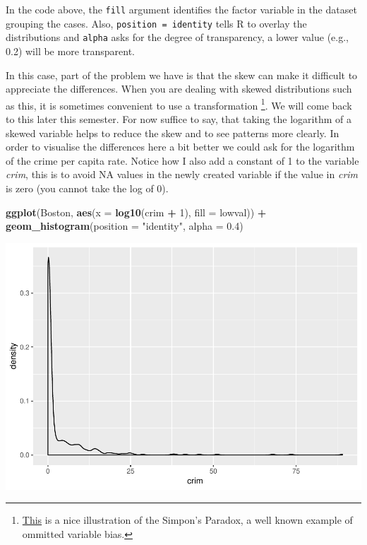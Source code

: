 \documentclass[]{book}
\newenvironment{Shaded}{\begin{snugshade}}{\end{snugshade}}
\newcommand{\DataTypeTok}[1]{\textcolor[rgb]{0.13,0.29,0.53}{#1}}
\newcommand{\DecValTok}[1]{\textcolor[rgb]{0.00,0.00,0.81}{#1}}
\newcommand{\FloatTok}[1]{\textcolor[rgb]{0.00,0.00,0.81}{#1}}
\newcommand{\KeywordTok}[1]{\textcolor[rgb]{0.13,0.29,0.53}{\textbf{#1}}}
\newcommand{\NormalTok}[1]{#1}
\newcommand{\OperatorTok}[1]{\textcolor[rgb]{0.81,0.36,0.00}{\textbf{#1}}}
\newcommand{\StringTok}[1]{\textcolor[rgb]{0.31,0.60,0.02}{#1}}
\let\rmarkdownfootnote\footnote%
\def\footnote{\protect\rmarkdownfootnote}
\theoremstyle{definition}
\theoremstyle{definition}
\theoremstyle{definition}
\theoremstyle{remark}
\begin{document}
In the code above, the \texttt{fill} argument identifies the factor
variable in the dataset grouping the cases. Also,
\texttt{position\ =\ identity} tells R to overlay the distributions and
\texttt{alpha} asks for the degree of transparency, a lower value (e.g.,
0.2) will be more transparent.

In this case, part of the problem we have is that the skew can make it
difficult to appreciate the differences. When you are dealing with
skewed distributions such as this, it is sometimes convenient to use a
transformation \footnote{\href{http://vudlab.com/simpsons/}{This} is a
  nice illustration of the Simpon's Paradox, a well known example of
  ommitted variable bias.}. We will come back to this later this
semester. For now suffice to say, that taking the logarithm of a skewed
variable helps to reduce the skew and to see patterns more clearly. In
order to visualise the differences here a bit better we could ask for
the logarithm of the crime per capita rate. Notice how I also add a
constant of 1 to the variable \emph{crim}, this is to avoid NA values in
the newly created variable if the value in \emph{crim} is zero (you
cannot take the log of 0).

\begin{Shaded}
\begin{Highlighting}[]
\KeywordTok{ggplot}\NormalTok{(Boston, }\KeywordTok{aes}\NormalTok{(}\DataTypeTok{x =} \KeywordTok{log10}\NormalTok{(crim }\OperatorTok{+}\StringTok{ }\DecValTok{1}\NormalTok{), }\DataTypeTok{fill =}\NormalTok{ lowval)) }\OperatorTok{+}
\StringTok{  }\KeywordTok{geom_histogram}\NormalTok{(}\DataTypeTok{position =} \StringTok{"identity"}\NormalTok{, }\DataTypeTok{alpha =} \FloatTok{0.4}\NormalTok{)}
\end{Highlighting}
\end{Shaded}

\includegraphics{03-visualisation_files/figure-latex/unnamed-chunk-23-1.pdf}
\end{document}
